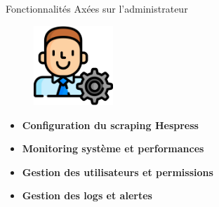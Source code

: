 \begin{frame}{Fonctionnalités Axées sur l'administrateur}
    \begin{figure}[H]
        \centering
        \includegraphics[height=3cm]{assets/images/admin.png}
    \end{figure}

    \begin{itemize}
        \setlength\itemsep{0.8em} %
        \item \textbf{Configuration du scraping Hespress}
        \item \textbf{Monitoring système et performances}
        \item \textbf{Gestion des utilisateurs et permissions}
        \item \textbf{Gestion des logs et alertes}
    \end{itemize}
\end{frame}
